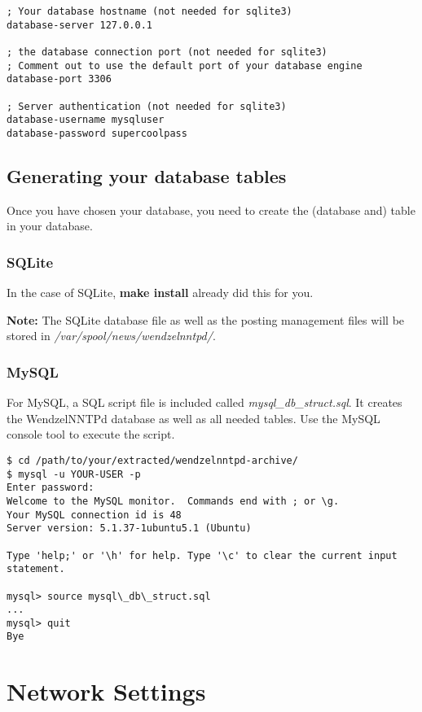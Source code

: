 \begin{verbatim}
; Your database hostname (not needed for sqlite3)
database-server 127.0.0.1

; the database connection port (not needed for sqlite3)
; Comment out to use the default port of your database engine
database-port 3306

; Server authentication (not needed for sqlite3)
database-username mysqluser
database-password supercoolpass
\end{verbatim}

\subsection{Generating your database tables}

Once you have chosen your database, you need to create the (database and) table in your database.

\subsubsection{SQLite}

In the case of SQLite, {\bf make install} already did this for you.

{\bf Note:} The SQLite database file as well as the posting management files will be stored in {\it /var/spool/news/wendzelnntpd/}.

\subsubsection{MySQL}

For MySQL, a SQL script file is included called {\it mysql\_db\_struct.sql}. It creates the WendzelNNTPd database as well as all needed tables. Use the MySQL console tool to execute the script.

\begin{verbatim}
$ cd /path/to/your/extracted/wendzelnntpd-archive/
$ mysql -u YOUR-USER -p
Enter password: 
Welcome to the MySQL monitor.  Commands end with ; or \g.
Your MySQL connection id is 48
Server version: 5.1.37-1ubuntu5.1 (Ubuntu)

Type 'help;' or '\h' for help. Type '\c' to clear the current input statement.

mysql> source mysql\_db\_struct.sql
...
mysql> quit
Bye
\end{verbatim}

\section{Network Settings}

